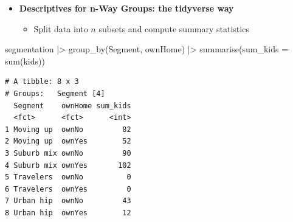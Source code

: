 \documentclass[
  ignorenonframetext,
]{beamer}
\newenvironment{Shaded}{\begin{snugshade}}{\end{snugshade}}
\newcommand{\AttributeTok}[1]{\textcolor[rgb]{0.40,0.45,0.13}{#1}}
\newcommand{\FunctionTok}[1]{\textcolor[rgb]{0.28,0.35,0.67}{#1}}
\newcommand{\NormalTok}[1]{\textcolor[rgb]{0.00,0.23,0.31}{#1}}
\newcommand{\SpecialCharTok}[1]{\textcolor[rgb]{0.37,0.37,0.37}{#1}}
\providecommand{\tightlist}{%
  \setlength{\itemsep}{0pt}\setlength{\parskip}{0pt}}\usepackage{longtable,booktabs,array}
\begin{document}
\begin{frame}[fragile]{}
\label{section-10}
\begin{itemize}
\item
  \textbf{Descriptives for n-Way Groups: the tidyverse way}

  \begin{itemize}
  \tightlist
  \item
    Split data into \(n\) subsets and compute summary statistics
  \end{itemize}
\end{itemize}

\tiny

\begin{Shaded}
\begin{Highlighting}[]
\NormalTok{segmentation }\SpecialCharTok{|\textgreater{}} 
  \FunctionTok{group\_by}\NormalTok{(Segment, ownHome) }\SpecialCharTok{|\textgreater{}}
  \FunctionTok{summarise}\NormalTok{(}\AttributeTok{sum\_kids =} \FunctionTok{sum}\NormalTok{(kids))}
\end{Highlighting}
\end{Shaded}

\begin{verbatim}
# A tibble: 8 x 3
# Groups:   Segment [4]
  Segment    ownHome sum_kids
  <fct>      <fct>      <int>
1 Moving up  ownNo         82
2 Moving up  ownYes        52
3 Suburb mix ownNo         90
4 Suburb mix ownYes       102
5 Travelers  ownNo          0
6 Travelers  ownYes         0
7 Urban hip  ownNo         43
8 Urban hip  ownYes        12
\end{verbatim}
\end{frame}
\end{document}
